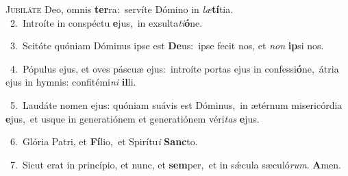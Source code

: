 \lettrine{\initial\textcolor{\initialcolor}{J}}{ubiláte} Deo, omnis \textbf{ter}\-ra:~\star servíte Dómino in \textit{læ}\-\textbf{tí}tia.\\
{\numbfont\textcolor{\numbcolor}{~2.}}~Introíte in conspéctu \textbf{e}\-jus,~\star in exsulta\-\textit{ti}\-\textbf{ó}ne.\par
{\numbfont\textcolor{\numbcolor}{~3.}}~Scitóte quóniam Dóminus ipse est \textbf{De}\-us:~\star ipse fecit nos, et \textit{non} \textbf{ip}\-si nos.\par
{\numbfont\textcolor{\numbcolor}{~4.}}~Pópulus ejus, et oves páscuæ ejus:~\dagger introíte portas ejus in confessi\-\textbf{ó}\-ne,~\star átria ejus in hymnis: confitémi\textit{ni} \textbf{il}\-li.\par
{\numbfont\textcolor{\numbcolor}{~5.}}~Laudáte nomen ejus: quóniam suávis est Dóminus,~\dagger in ætérnum misericórdia \textbf{e}\-jus,~\star et usque in generatiónem et generatiónem véri\textit{tas} \textbf{e}\-jus.\par
{\numbfont\textcolor{\numbcolor}{~6.}}~Glória Patri, et \textbf{Fí}\-lio,~\star et Spirítu\textit{i} \textbf{Sanc}\-to.\par
{\numbfont\textcolor{\numbcolor}{~7.}}~Sicut erat in princípio, et nunc, et \textbf{sem}\-per,~\star et in sǽcula sæculó\-\textit{rum}\-. \textbf{A}\-men.\par
